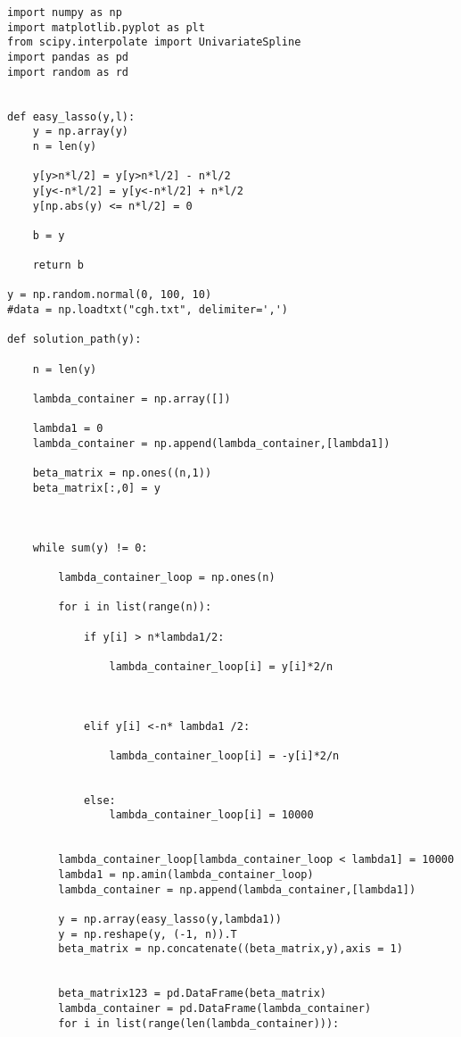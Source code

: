 \documentclass{article}
\theoremstyle{definition}
\begin{document}
\begin{lstlisting}
import numpy as np
import matplotlib.pyplot as plt
from scipy.interpolate import UnivariateSpline
import pandas as pd
import random as rd


def easy_lasso(y,l):
    y = np.array(y)
    n = len(y)
    
    y[y>n*l/2] = y[y>n*l/2] - n*l/2
    y[y<-n*l/2] = y[y<-n*l/2] + n*l/2
    y[np.abs(y) <= n*l/2] = 0
    
    b = y
    
    return b

y = np.random.normal(0, 100, 10)
#data = np.loadtxt("cgh.txt", delimiter=',')

def solution_path(y):
    
    n = len(y)
    
    lambda_container = np.array([])
    
    lambda1 = 0
    lambda_container = np.append(lambda_container,[lambda1])
    
    beta_matrix = np.ones((n,1))
    beta_matrix[:,0] = y
    
    
    
    while sum(y) != 0:
        
        lambda_container_loop = np.ones(n)
        
        for i in list(range(n)):
            
            if y[i] > n*lambda1/2:
                
                lambda_container_loop[i] = y[i]*2/n
                
                
                
            elif y[i] <-n* lambda1 /2:
                
                lambda_container_loop[i] = -y[i]*2/n
                
                
            else:
                lambda_container_loop[i] = 10000
                
                
        lambda_container_loop[lambda_container_loop < lambda1] = 10000
        lambda1 = np.amin(lambda_container_loop)
        lambda_container = np.append(lambda_container,[lambda1])
        
        y = np.array(easy_lasso(y,lambda1))
        y = np.reshape(y, (-1, n)).T
        beta_matrix = np.concatenate((beta_matrix,y),axis = 1)
        
        
        beta_matrix123 = pd.DataFrame(beta_matrix)
        lambda_container = pd.DataFrame(lambda_container)
        for i in list(range(len(lambda_container))):
            

\end{lstlisting}
\end{document}
